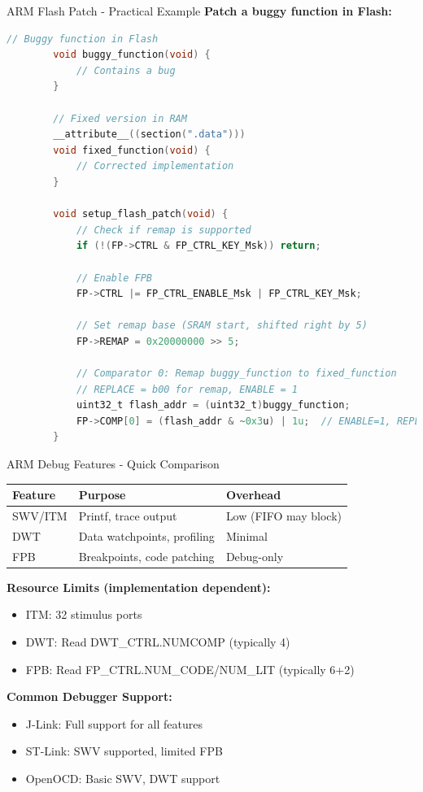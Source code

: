 \documentclass{beamer}
\begin{document}
\begin{frame}[fragile]{ARM}
	{Flash Patch - Practical Example}
	\textbf{Patch a buggy function in Flash:}
	\begin{lstlisting}[language=C, basicstyle=\ttfamily\tiny]
		// Buggy function in Flash
		void buggy_function(void) {
			// Contains a bug
		}
		
		// Fixed version in RAM
		__attribute__((section(".data")))
		void fixed_function(void) {
			// Corrected implementation
		}
		
		void setup_flash_patch(void) {
			// Check if remap is supported
			if (!(FP->CTRL & FP_CTRL_KEY_Msk)) return;
			
			// Enable FPB
			FP->CTRL |= FP_CTRL_ENABLE_Msk | FP_CTRL_KEY_Msk;
			
			// Set remap base (SRAM start, shifted right by 5)
			FP->REMAP = 0x20000000 >> 5;
			
			// Comparator 0: Remap buggy_function to fixed_function
			// REPLACE = b00 for remap, ENABLE = 1
			uint32_t flash_addr = (uint32_t)buggy_function;
			FP->COMP[0] = (flash_addr & ~0x3u) | 1u;  // ENABLE=1, REPLACE=00
		}
	\end{lstlisting}
\end{frame}

\begin{frame}{ARM}
	{Debug Features - Quick Comparison}
	\begin{center}
		\small
		\begin{tabular}{|l|l|l|}
			\hline
			\textbf{Feature} & \textbf{Purpose} & \textbf{Overhead} \\ \hline
			SWV/ITM & Printf, trace output & Low (FIFO may block) \\ \hline
			DWT & Data watchpoints, profiling & Minimal \\ \hline
			FPB & Breakpoints, code patching & Debug-only \\ \hline
		\end{tabular}
	\end{center}
	
	\vspace{0.2cm}
	\textbf{Resource Limits (implementation dependent):}
	\begin{itemize}
		\item ITM: 32 stimulus ports
		\item DWT: Read DWT\_CTRL.NUMCOMP (typically 4)
		\item FPB: Read FP\_CTRL.NUM\_CODE/NUM\_LIT (typically 6+2)
	\end{itemize}
	
	\vspace{0.2cm}
	\textbf{Common Debugger Support:}
	\begin{itemize}
		\item J-Link: Full support for all features
		\item ST-Link: SWV supported, limited FPB
		\item OpenOCD: Basic SWV, DWT support
	\end{itemize}
\end{frame}
\end{document}
